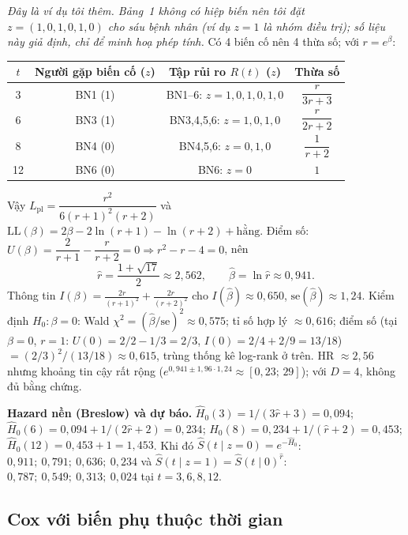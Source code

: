\documentclass[11pt,a4paper,notitlepage]{report}
\begin{document}
\begin{vidu}
\textit{Đây là ví dụ tôi thêm. Bảng~1 không có hiệp biến nên tôi đặt $z=(1,0,1,0,1,0)$ cho sáu bệnh nhân (ví dụ $z=1$ là nhóm điều trị); số liệu này giả định, chỉ để minh hoạ phép tính.}
Có 4 biến cố nên 4 thừa số; với $r=e^\beta$:
\begin{center}\small
\begin{tabular}{cccc}
\toprule
$t$ & Người gặp biến cố ($z$) & Tập rủi ro $R(t)$ ($z$) & Thừa số\\
\midrule
3 & BN1 (1) & BN1--6: $z=1,0,1,0,1,0$ & $\dfrac{r}{3r+3}$\\
6 & BN3 (1) & BN3,4,5,6: $z=1,0,1,0$ & $\dfrac{r}{2r+2}$\\
8 & BN4 (0) & BN4,5,6: $z=0,1,0$ & $\dfrac{1}{r+2}$\\
12 & BN6 (0) & BN6: $z=0$ & $1$\\
\bottomrule
\end{tabular}
\end{center}
Vậy $L_{\mathrm{pl}}=\dfrac{r^2}{6(r+1)^2(r+2)}$ và $\mathrm{LL}(\beta)=2\beta-2\ln(r+1)-\ln(r+2)+\text{hằng}$. Điểm số: $U(\beta)=\dfrac{2}{r+1}-\dfrac{r}{r+2}=0\Rightarrow r^2-r-4=0$, nên
\[
\hat r=\frac{1+\sqrt{17}}2\approx2{,}562,\qquad\hat\beta=\ln\hat r\approx0{,}941.
\]
Thông tin $I(\beta)=\frac{2r}{(r+1)^2}+\frac{2r}{(r+2)^2}$ cho $I(\hat\beta)\approx0{,}650$, $\mathrm{se}(\hat\beta)\approx1{,}24$. Kiểm định $H_0:\beta=0$:
Wald $\chi^2=(\hat\beta/\mathrm{se})^2\approx0{,}575$; tỉ số hợp lý $\approx0{,}616$; điểm số (tại $\beta=0$, $r=1$: $U(0)=2/2-1/3=2/3$, $I(0)=2/4+2/9=13/18$) $=(2/3)^2/(13/18)\approx0{,}615$, trùng thống kê log-rank ở trên.
HR $\approx2{,}56$ nhưng khoảng tin cậy rất rộng ($e^{0{,}941\pm1{,}96\cdot1{,}24}\approx[0{,}23;\,29]$); với $D=4$, không đủ bằng chứng.

\textbf{Hazard nền (Breslow) và dự báo.} $\hat H_0(3)=1/(3\hat r+3)=0{,}094$; $\hat H_0(6)=0{,}094+1/(2\hat r+2)=0{,}234$; $\hat H_0(8)=0{,}234+1/(\hat r+2)=0{,}453$; $\hat H_0(12)=0{,}453+1=1{,}453$.
Khi đó $\hat S(t\mid z=0)=e^{-\hat H_0}$: $0{,}911;\ 0{,}791;\ 0{,}636;\ 0{,}234$ và $\hat S(t\mid z=1)=\hat S(t\mid0)^{\hat r}$: $0{,}787;\ 0{,}549;\ 0{,}313;\ 0{,}024$ tại $t=3,6,8,12$.
\end{vidu}

\subsection{Cox với biến phụ thuộc thời gian}\label{sec:tvc}
\end{document}
